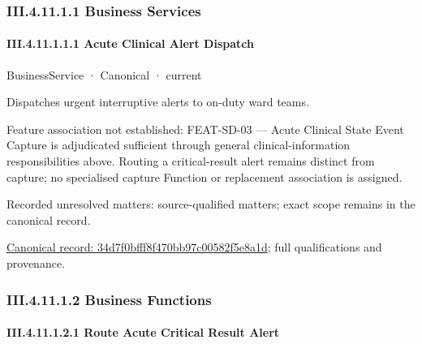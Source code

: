 \subsubsection*{III.4.11.1.1 Business Services}
\label{navigation:III.4.11.1.1}

\paragraph*{III.4.11.1.1.1 Acute Clinical Alert Dispatch}
\label{navigation:III.4.11.1.1.1}

\label{element:34d7f0bfff8f470bb97c00582f5e8a1d}
{\small BusinessService · Canonical · current}\par

Dispatches urgent interruptive alerts to on-duty ward teams.



Feature association not established: FEAT-SD-03 — Acute Clinical State Event Capture is adjudicated sufficient through general clinical-information responsibilities above. Routing a critical-result alert remains distinct from capture; no specialised capture Function or replacement association is assigned.


{\small Recorded unresolved matters: source-qualified matters; exact scope remains in the canonical record.}\par
{\footnotesize \href{../../../../continuum/business/business-service/34d7f0bfff8f470bb97c00582f5e8a1d.md}{Canonical record: 34d7f0bfff8f470bb97c00582f5e8a1d}; full qualifications and provenance.}\par
\subsubsection*{III.4.11.1.2 Business Functions}
\label{navigation:III.4.11.1.2}

\paragraph*{III.4.11.1.2.1 Route Acute Critical Result Alert}
\label{navigation:III.4.11.1.2.1}

